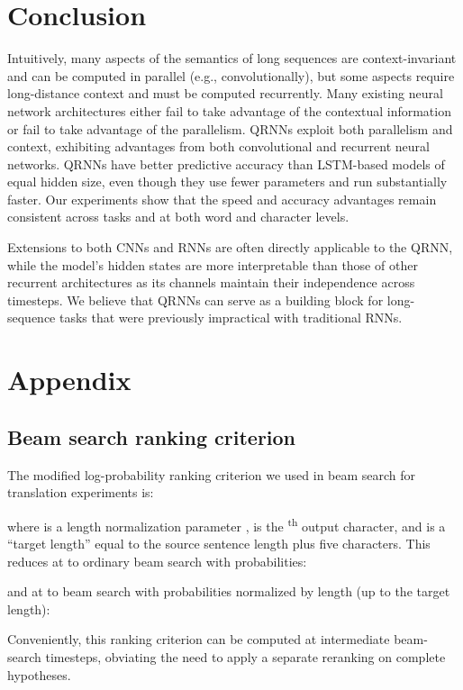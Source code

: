 \documentclass{article} \usepackage{iclr2017_conference,times}
\begin{document}
\section{Conclusion}

Intuitively, many aspects of the semantics of long sequences are context-invariant and can be computed in parallel (e.g., convolutionally), but some aspects require long-distance context and must be computed recurrently. Many existing neural network architectures either fail to take advantage of the contextual information or fail to take advantage of the parallelism.
QRNNs exploit both parallelism and context, exhibiting advantages from both convolutional and recurrent neural networks.
QRNNs have better predictive accuracy than LSTM-based models of equal hidden size, even though they use fewer parameters and run substantially faster.
Our experiments show that the speed and accuracy advantages remain consistent across tasks and at both word and character levels.

Extensions to both CNNs and RNNs are often directly applicable to the QRNN, while the model's hidden states are more interpretable than those of other recurrent architectures as its channels maintain their independence across timesteps.
We believe that QRNNs can serve as a building block for long-sequence tasks that were previously impractical with traditional RNNs.




\setcounter{figure}{0}
\renewcommand{\thefigure}{A\arabic{figure}}


\clearpage
\section*{Appendix}

\subsection*{Beam search ranking criterion}
The modified log-probability ranking criterion we used in beam search for translation experiments is:

where  is a length normalization parameter \citep{Wu2016},  is the \textsuperscript{th} output character, and  is a ``target length'' equal to the source sentence length plus five characters. This reduces at  to ordinary beam search with probabilities:

and at  to beam search with probabilities normalized by length (up to the target length): 

Conveniently, this ranking criterion can be computed at intermediate beam-search timesteps, obviating the need to apply a separate reranking on complete hypotheses.
\end{document}
